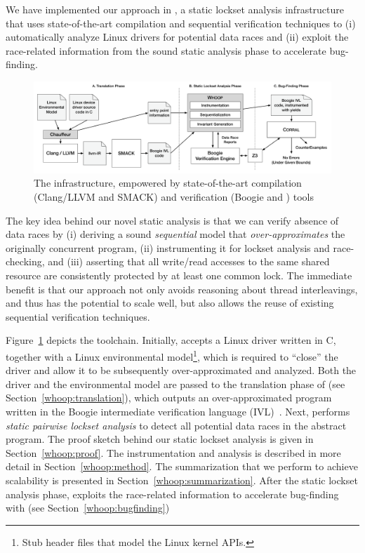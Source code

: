{We have implemented our approach in \whoop, a static lockset analysis infrastructure that uses state-of-the-art compilation and sequential verification techniques to (i) automatically analyze Linux drivers for potential data races and (ii) exploit the race-related information from the sound static analysis phase to accelerate bug-finding.

\begin{figure}
\centering
\includegraphics[width=.99\linewidth]{img/whoop.pdf}
\caption{The \whoop infrastructure, empowered by state-of-the-art compilation (Clang/LLVM and SMACK) and verification (Boogie and \corral) tools}
\label{fig:whoop}
\end{figure}

The key idea behind our novel static analysis is that we can verify absence of data races by (i) deriving a sound \emph{sequential} model that \emph{over-approximates} the originally concurrent program, (ii) instrumenting it for lockset analysis and race-checking, and (iii) asserting that all write/read accesses to the same shared resource are consistently protected by at least one common lock. The immediate benefit is that our approach not only avoids reasoning about thread interleavings, and thus has the potential to scale well, but also allows the reuse of existing sequential verification techniques.

Figure~\ref{fig:whoop} depicts the \whoop toolchain. Initially, \whoop accepts a Linux driver written in C, together with a Linux environmental model\footnote{Stub header files that model the Linux kernel APIs.}, which is required to ``close'' the driver and allow it to be subsequently over-approximated and analyzed. Both the driver and the environmental model are passed to the translation phase of \whoop (see Section~\ref{whoop:translation}), which outputs an over-approximated program written in the Boogie intermediate verification language (IVL)~\cite{deline2005boogiepl}. Next, \whoop performs \emph{static pairwise lockset analysis} to detect all potential data races in the abstract program. The proof sketch behind our static lockset analysis is given in Section~\ref{whoop:proof}. The instrumentation and analysis is described in more detail in Section~\ref{whoop:method}. The summarization that we perform to achieve scalability is presented in Section~\ref{whoop:summarization}. After the static lockset analysis phase, \whoop exploits the race-related information to accelerate bug-finding with \corral (see Section~\ref{whoop:bugfinding})

}
